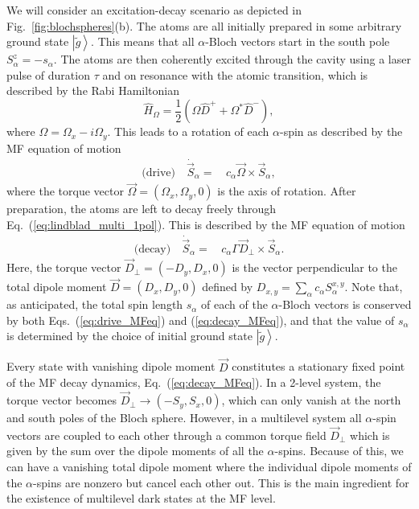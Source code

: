 \documentclass[aps,prx,superscriptaddress,twocolumn,notitlepage,nofootinbib,longbibliography]{revtex4-2}
\newcommand{\ket}[1]{\left|#1\right>}
\begin{document}
We will consider an excitation-decay scenario as depicted in Fig.~\ref{fig:blochspheres}(b).
The atoms are all initially prepared in some arbitrary ground state $\ket{\tilde{g}}$.
This means that all $\alpha$-Bloch vectors start in the south pole $S^z_\alpha = - s_\alpha$.
The atoms are then coherently excited through the cavity using a laser pulse of duration $\tau$ and on resonance with the atomic transition, which is described by the Rabi Hamiltonian
\begin{equation}
    \hat{H}_\Omega = \frac{1}{2}(\Omega \hat{D}^+ + \Omega^* \hat{D}^-),
\label{eq:H_Rabi}
\end{equation}
where $\Omega=\Omega_x-i\Omega_y$.
This leads to a rotation of each $\alpha$-spin as described by the MF equation of motion
\begin{align}
	\text{(drive)}\quad \dot{\vec{S}}_\alpha =&\, c_\alpha \vec{\Omega} \times \vec{S}_\alpha,
\label{eq:drive_MFeq}
\end{align}
where the torque vector $\vec{\Omega}=(\Omega_x,\Omega_y,0)$ is the axis of rotation.
After preparation, the atoms are left to decay freely through Eq.~(\ref{eq:lindblad_multi_1pol}). This is described by the MF equation of motion
\begin{align}
	\text{(decay)}\quad \dot{\vec{S}}_\alpha =&\, c_\alpha \Gamma \vec{D}_\perp \times \vec{S}_\alpha.
\label{eq:decay_MFeq}
\end{align}
Here, the torque vector $\vec{D}_\perp=(-D_y,D_x,0)$ is the vector perpendicular to the total dipole moment $\vec{D}=(D_x,D_y,0)$ defined by $D_{x,y}=\sum_\alpha c_\alpha S^{x,y}_\alpha$.
Note that, as anticipated, the total spin length $s_\alpha$ of each of the $\alpha$-Bloch vectors is conserved by both Eqs.~(\ref{eq:drive_MFeq}) and (\ref{eq:decay_MFeq}), and that the value of $s_\alpha$ is determined by the choice of initial ground state $\ket{\tilde{g}}$.

Every state with vanishing dipole moment $\vec{D}$ constitutes a stationary fixed point of the MF decay dynamics, Eq.~(\ref{eq:decay_MFeq}).
In a 2-level system, the torque vector becomes $\vec{D}_\perp \rightarrow (-S_y,S_x,0)$, which can only vanish at the north and south poles of the Bloch sphere.
However, in a multilevel system all $\alpha$-spin vectors are coupled to each other through a common torque field $\vec{D}_\perp$ which is given by the sum over the dipole moments of all the $\alpha$-spins.
Because of this, we can have a vanishing total dipole moment where the individual dipole moments of the $\alpha$-spins are nonzero but cancel each other out.
This is the main ingredient for the existence of multilevel dark states at the MF level.
\end{document}
